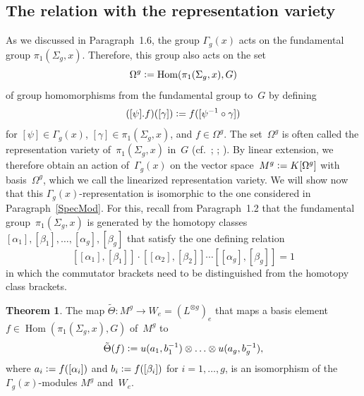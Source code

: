 \documentclass[12pt]{article}
\theoremstyle{definition}
\newtheorem{Theorem}[Satz]{Theorem}
\theoremstyle{break}
\DeclareMathOperator\Hom{Hom}
\renewcommand{\1}{\mathbbm{1}}
\newcommand{\ot}{\mathbin{\otimes}}
\newcommand{\uu}{u}
\newcommand{\deq}{\vcentcolon =}
\begin{document}
\subsection{The relation with the representation variety} \label{RelRepVar}
As we discussed in Paragraph~1.6, the group $\Gamma_{g}(x)$ acts on the fundamental group $\pi_1(\Sigma_{g},x)$. Therefore, this group also acts on the set
\[\Omega^g \deq \Hom(\pi_1(\Sigma_{g},x),G)\]
of group homomorphisms from the fundamental group to~$G$ by defining
\[([\psi].f)([\gamma]) \deq f([\psi^{-1} \circ \gamma])  \]
for $[\psi] \in \Gamma_{g}(x)$, $[\gamma] \in \pi_1(\Sigma_{g},x)$, and
$f \in \Omega^g$. The set~$\Omega^g$ is often called the representation variety of~$\pi_1(\Sigma_{g},x)$ in~$G$ (cf.~\cite[Sec.~2, p.~5]{GM}; \cite[p.~339]{PX}; \cite[Sec.~5, p.~5182]{Si}). By linear extension, we therefore obtain an action
of~$\Gamma_{g}(x)$ on the vector space~$M^g \deq K[\Omega^g]$ with basis~$\Omega^g$, which we call the linearized representation variety. We will show now that this $\Gamma_{g}(x)$-representation is isomorphic to the one considered in Paragraph~\ref{SpecMod}. For this, recall from Paragraph~1.2 that the fundamental group~$\pi_1(\Sigma_{g},x)$ is generated by the homotopy classes $[\alpha_1],[\beta_1],\ldots,[\alpha_g],[\beta_g]$ that satisfy the one defining relation
\[ [[\alpha_1], [\beta_1] ] \cdot [[\alpha_2], [\beta_2]] \cdots [[\alpha_g], [\beta_g]] = 1\]
in which the commutator brackets need to be distinguished from the homotopy class brackets.
\begin{Theorem} \label{ThmModTilde}
The map 
$\tilde{\Theta} \colon M^g \to W_e = (L^{\ot g})_e$ that maps a basis element
\mbox{$f \in \Hom(\pi_1(\Sigma_{g},x),G)$} of~$M^g$ to 
\[\tilde{\Theta}(f) \deq \uu(a_1,b_1^{-1}) \ot \dots \ot \uu(a_g,b_g^{-1}),\]
where $a_i \deq f([\alpha_i])$ and $b_i \deq f([\beta_i])$ for $i=1,\ldots,g$, is an isomorphism of the \mbox{$\Gamma_{g}(x)$-modules} $M^g$ and~$W_e$.
\end{Theorem}
\end{document}
